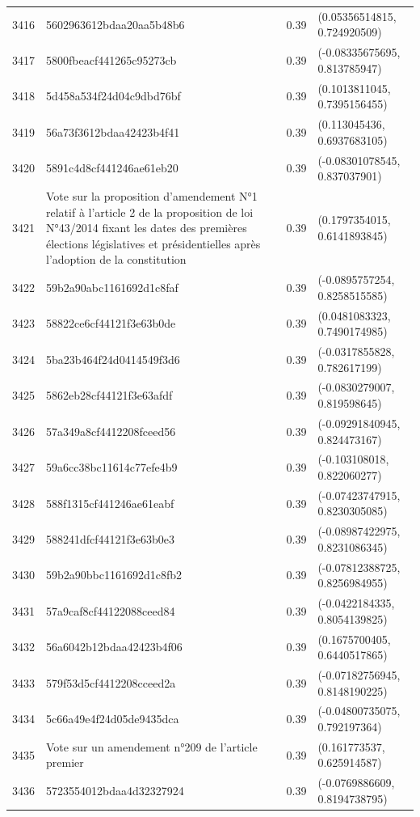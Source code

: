 \begin{table}[ht]
\begin{tabular}{rlrl}
  3416 & 5602963612bdaa20aa5b48b6 & 0.39 & (0.05356514815, 0.724920509) \\ 
  3417 & 5800fbeacf441265c95273cb & 0.39 & (-0.08335675695, 0.813785947) \\ 
  3418 & 5d458a534f24d04c9dbd76bf & 0.39 & (0.1013811045, 0.7395156455) \\ 
  3419 & 56a73f3612bdaa42423b4f41 & 0.39 & (0.113045436, 0.6937683105) \\ 
  3420 & 5891c4d8cf441246ae61eb20 & 0.39 & (-0.08301078545, 0.837037901) \\ 
  3421 & Vote sur la proposition d'amendement N°1 relatif à l'article 2 de la proposition de loi N°43/2014 fixant les dates des premières élections législatives et présidentielles après l'adoption de la constitution & 0.39 & (0.1797354015, 0.6141893845) \\ 
  3422 & 59b2a90abc1161692d1c8faf & 0.39 & (-0.0895757254, 0.8258515585) \\ 
  3423 & 58822ce6cf44121f3e63b0de & 0.39 & (0.0481083323, 0.7490174985) \\ 
  3424 & 5ba23b464f24d0414549f3d6 & 0.39 & (-0.0317855828, 0.782617199) \\ 
  3425 & 5862eb28cf44121f3e63afdf & 0.39 & (-0.0830279007, 0.819598645) \\ 
  3426 & 57a349a8cf4412208fceed56 & 0.39 & (-0.09291840945, 0.824473167) \\ 
  3427 & 59a6cc38bc11614c77efe4b9 & 0.39 & (-0.103108018, 0.822060277) \\ 
  3428 & 588f1315cf441246ae61eabf & 0.39 & (-0.07423747915, 0.8230305085) \\ 
  3429 & 588241dfcf44121f3e63b0e3 & 0.39 & (-0.08987422975, 0.8231086345) \\ 
  3430 & 59b2a90bbc1161692d1c8fb2 & 0.39 & (-0.07812388725, 0.8256984955) \\ 
  3431 & 57a9caf8cf44122088ceed84 & 0.39 & (-0.0422184335, 0.8054139825) \\ 
  3432 & 56a6042b12bdaa42423b4f06 & 0.39 & (0.1675700405, 0.6440517865) \\ 
  3433 & 579f53d5cf4412208cceed2a & 0.39 & (-0.07182756945, 0.8148190225) \\ 
  3434 & 5c66a49e4f24d05de9435dca & 0.39 & (-0.04800735075, 0.792197364) \\ 
  3435 & Vote sur un amendement n°209 de l'article premier & 0.39 & (0.161773537, 0.625914587) \\ 
  3436 & 5723554012bdaa4d32327924 & 0.39 & (-0.0769886609, 0.8194738795) \\ 

\end{tabular}
\end{table}

